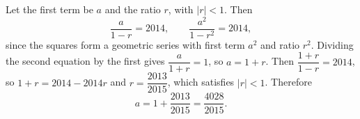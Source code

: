Let the first term be $a$ and the ratio $r$, with $|r|<1$. Then
\[
\dfrac{a}{1-r}=2014,\qquad \dfrac{a^2}{1-r^2}=2014 ,
\]
since the squares form a geometric series with first term $a^2$ and ratio $r^2$. Dividing the second equation by the first gives $\dfrac{a}{1+r}=1$, so $a=1+r$. Then $\dfrac{1+r}{1-r}=2014$, so $1+r=2014-2014r$ and $r=\dfrac{2013}{2015}$, which satisfies $|r|<1$. Therefore
\[
a=1+\dfrac{2013}{2015}=\boxed{\dfrac{4028}{2015}} .
\]
